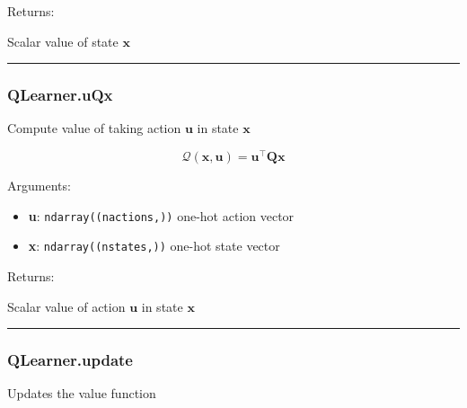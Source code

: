 Returns:

Scalar value of state \(\mathbf x\)

\begin{center}\rule{0.5\linewidth}{\linethickness}\end{center}

\hypertarget{qlearner.uqx}{%
\subsubsection{QLearner.uQx}\label{qlearner.uqx}}

\begin{Shaded}
\begin{Highlighting}[]
\end{Highlighting}
\end{Shaded}

Compute value of taking action \(\mathbf u\) in state \(\mathbf x\)

\[
\mathcal Q(\mathbf x, \mathbf u) = \mathbf u^\top \mathbf Q \mathbf x
\]

Arguments:

\begin{itemize}
\tightlist
\item
  \textbf{u}: \texttt{ndarray((nactions,))} one-hot action vector
\item
  \textbf{x}: \texttt{ndarray((nstates,))} one-hot state vector
\end{itemize}

Returns:

Scalar value of action \(\mathbf u\) in state \(\mathbf x\)

\begin{center}\rule{0.5\linewidth}{\linethickness}\end{center}

\hypertarget{qlearner.update}{%
\subsubsection{QLearner.update}\label{qlearner.update}}

\begin{Shaded}
\begin{Highlighting}[]
\end{Highlighting}
\end{Shaded}

Updates the value function

